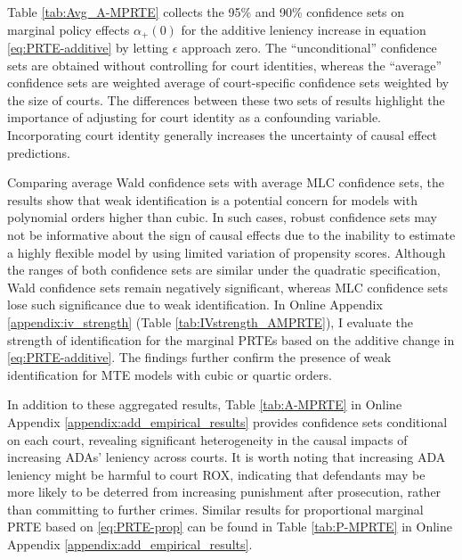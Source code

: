 \documentclass[11pt]{article}
\theoremstyle{definition}
\newcommand{\0}{\ensuremath{\mathbf{0}}}
\begin{document}
\begin{bibunit}
Table \ref{tab:Avg_A-MPRTE} collects the 95\% and 90\% confidence sets on marginal policy effects $\alpha_+(0)$ for the additive leniency increase in equation \eqref{eq:PRTE-additive} by letting $\epsilon$ approach zero. The ``unconditional'' confidence sets are obtained without controlling for court identities, whereas the ``average'' confidence sets are weighted average of court-specific confidence sets weighted by the size of courts. The differences between these two sets of results highlight the importance of adjusting for court identity as a confounding variable. Incorporating court identity generally increases the uncertainty of causal effect predictions. 

Comparing average Wald confidence sets with average MLC confidence sets, the results show that weak identification is a potential concern for models with polynomial orders higher than cubic. In such cases, robust confidence sets may not be informative about the sign of causal effects due to the inability to estimate a highly flexible model by using limited variation of propensity scores. Although the ranges of both confidence sets are similar under the quadratic specification, Wald confidence sets remain negatively significant, whereas MLC confidence sets lose such significance due to weak identification. In Online Appendix \ref{appendix:iv_strength} (Table \ref{tab:IVstrength_AMPRTE}), I evaluate the strength of identification for the marginal PRTEs based on the additive change in \eqref{eq:PRTE-additive}. The findings further confirm the presence of weak identification for MTE models with cubic or quartic orders.

In addition to these aggregated results, Table \ref{tab:A-MPRTE} in Online Appendix \ref{appendix:add_empirical_results} provides confidence sets conditional on each court, revealing significant heterogeneity in the causal impacts of increasing ADAs' leniency across courts. It is worth noting that increasing ADA leniency might be harmful to court ROX, indicating that defendants may be more likely to be deterred from increasing punishment after prosecution, rather than committing to further crimes. Similar results for proportional marginal PRTE based on \eqref{eq:PRTE-prop} can be found in Table \ref{tab:P-MPRTE} in Online Appendix \ref{appendix:add_empirical_results}. 



\end{bibunit}
\end{document}
